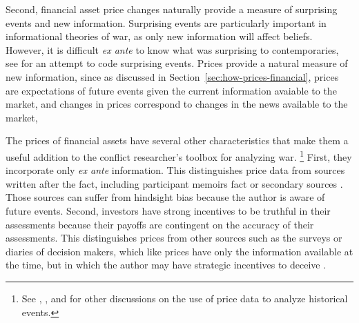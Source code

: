 Second, financial asset price changes naturally provide a measure of surprising events and new information.
Surprising events are particularly important in informational theories of war, as only new information will affect beliefs.
However,  it is difficult \textit{ex ante} to know what was surprising to contemporaries, see \textcite{Shirkey2009a} for an attempt to code surprising events.
Prices provide a natural measure of new information, since as discussed in Section~\ref{sec:how-prices-financial}, prices are  expectations of future events given the current information avaiable to the market, and changes in prices correspond to changes in the news available to the market, 

The prices of financial assets have several other characteristics that make them a useful addition to the conflict researcher's toolbox for analyzing war.
\footnote{See \textcite{WillardGuinnaneEtAl1996}, \textcite{north2000introd}, and \textcite{FreyKucher2000} for other  discussions on the use of price data to analyze historical events.} %
First, they incorporate only \textit{ex ante} information.
This distinguishes price data from sources written after the fact, including participant memoirs fact or secondary sources \parencites[1001]{WillardGuinnaneEtAl1996}[][188]{FreyKucher2000a}.
Those sources can suffer from hindsight bias because the author is aware of future events.
Second, investors have strong incentives to be truthful in their assessments because their payoffs are contingent on the accuracy of their assessments.
This distinguishes prices from other sources such as the surveys or diaries of decision makers, which like prices have only the information available at the time, but in which the author may have strategic incentives to deceive \parencite[57]{Reiter2009}.%
